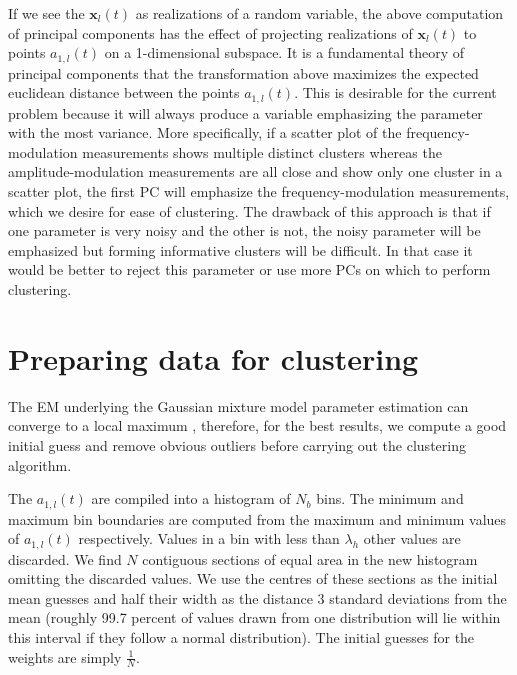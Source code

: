 If we see the $\mathbf{x}_{l}(t)$ as realizations of a random variable, the
above computation of principal components has the effect of projecting
realizations of $\mathbf{x}_{l}(t)$ to points $a_{1,l}(t)$ on a 1-dimensional
subspace. It is a fundamental theory of principal components that the
transformation above maximizes the expected euclidean distance between the
points $a_{1,l}(t)$. This is desirable for the current problem because it will
always produce a variable emphasizing the parameter with the most variance. More
specifically, if a scatter plot of the frequency-modulation measurements shows
multiple distinct clusters whereas the amplitude-modulation measurements are all
close and show only one cluster in a scatter plot, the first PC will emphasize
the frequency-modulation measurements, which we desire for ease of clustering.
The drawback of this approach is that if one parameter is very noisy and the
other is not, the noisy parameter will be emphasized but forming informative
clusters will be difficult. In that case it would be better to reject this
parameter or use more PCs on which to perform clustering.

\section{Preparing data for clustering \label{sec:amfmseppreparecluster}}
The EM underlying the Gaussian mixture model parameter
estimation can converge to a local maximum \cite{dempster1977maximum},
therefore, for the best results, we compute a good initial guess and remove
obvious outliers before carrying out the clustering algorithm.

The $a_{1,l}(t)$ are compiled into a histogram of $N_{b}$ bins. The minimum and
maximum bin boundaries are computed from the maximum and minimum values of
$a_{1,l}(t)$ respectively. Values in a bin with less than $\lambda_{h}$ other
values are discarded. We find $N$ contiguous sections of equal area in the
new histogram omitting the discarded values.  We use the centres of these
sections as the initial mean guesses and half their width as the distance 3
standard deviations from the mean (roughly 99.7 percent of values drawn from one
distribution will lie within this interval if they follow a normal
distribution). The initial guesses for the weights are simply $\frac{1}{N}$.

